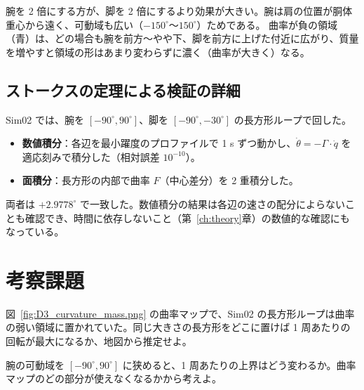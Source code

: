腕を 2 倍にする方が、脚を 2 倍にするより効果が大きい。腕は肩の位置が胴体重心から遠く、可動域も広い（$-150^\circ$〜$150^\circ$）ためである。
曲率が負の領域（青）は、どの場合も腕を前方〜やや下、脚を前方に上げた付近に広がり、質量を増やすと領域の形はあまり変わらずに濃く（曲率が大きく）なる。


\subsection{ストークスの定理による検証の詳細}

Sim02 では、腕を $[-90^\circ, 90^\circ]$、脚を $[-90^\circ, -30^\circ]$ の長方形ループで回した。
\begin{itemize}
\item \textbf{数値積分}：各辺を最小躍度のプロファイルで 1 s ずつ動かし、$\dot\theta=-\Gamma\cdot\dot q$ を適応刻みで積分した（相対誤差 $10^{-10}$）。
\item \textbf{面積分}：長方形の内部で曲率 $F$（中心差分）を 2 重積分した。
\end{itemize}
両者は $+2.9778^\circ$ で一致した。数値積分の結果は各辺の速さの配分によらないことも確認でき、時間に依存しないこと（第~\ref{ch:theory}章）の数値的な確認にもなっている。

\section*{考察課題}
\begin{exercise}
図~\ref{fig:D3_curvature_mass.png} の曲率マップで、Sim02 の長方形ループは曲率の弱い領域に置かれていた。同じ大きさの長方形をどこに置けば 1 周あたりの回転が最大になるか、地図から推定せよ。
\end{exercise}
\begin{exercise}
腕の可動域を $[-90^\circ, 90^\circ]$ に狭めると、1 周あたりの上界はどう変わるか。曲率マップのどの部分が使えなくなるかから考えよ。
\end{exercise}
